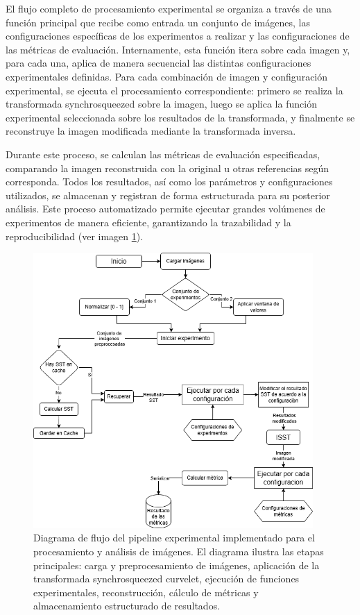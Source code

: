 El flujo completo de procesamiento experimental se organiza a través de una función principal que recibe como entrada un conjunto de imágenes, las configuraciones específicas de los experimentos a realizar y las configuraciones de las métricas de evaluación. Internamente, esta función itera sobre cada imagen y, para cada una, aplica de manera secuencial las distintas configuraciones experimentales definidas. Para cada combinación de imagen y configuración experimental, se ejecuta el procesamiento correspondiente: primero se realiza la transformada synchrosqueezed sobre la imagen, luego se aplica la función experimental seleccionada sobre los resultados de la transformada, y finalmente se reconstruye la imagen modificada mediante la transformada inversa.

Durante este proceso, se calculan las métricas de evaluación especificadas, comparando la imagen reconstruida con la original u otras referencias según corresponda. Todos los resultados, así como los parámetros y configuraciones utilizados, se almacenan y registran de forma estructurada para su posterior análisis. Este proceso automatizado permite ejecutar grandes volúmenes de experimentos de manera eficiente, garantizando la trazabilidad y la reproducibilidad (ver imagen \ref{fig:diagrama-flujo-experimentos}).

\begin{figure}[H]
    \centering
    \includegraphics[width=0.95\textwidth]{Graphics/diagrama experimentos tesis.drawio.png}
    \caption{Diagrama de flujo del pipeline experimental implementado para el procesamiento y análisis de imágenes. El diagrama ilustra las etapas principales: carga y preprocesamiento de imágenes, aplicación de la transformada synchrosqueezed curvelet, ejecución de funciones experimentales, reconstrucción, cálculo de métricas y almacenamiento estructurado de resultados.}
    \label{fig:diagrama-flujo-experimentos}
\end{figure}

